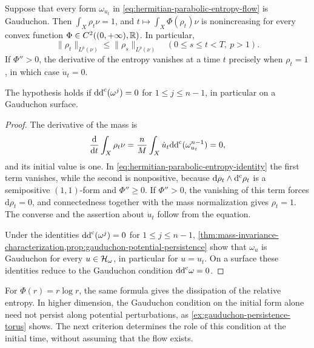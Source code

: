 \begin{corollary}\label{cor:gauduchon-parabolic-entropies}
Suppose that every form $\omega_{u_t}$ in \eqref{eq:hermitian-parabolic-entropy-flow} is Gauduchon. Then $\int_X\rho_t\nu=1$, and $t\mapsto\int_X\Phi(\rho_t)\nu$ is nonincreasing for every convex function $\Phi\in C^2((0,+\infty),\mathbb R)$. In particular,
\[
 \|\rho_t\|_{L^p(\nu)}\leq\|\rho_s\|_{L^p(\nu)}
 \quad(0\leq s\leq t<T,\ p>1).
\]
If $\Phi''>0$, the derivative of the entropy vanishes at a time $t$ precisely when $\rho_t=1$, in which case $\dot u_t=0$.

The hypothesis holds if $\mathrm{dd}^{\mathrm{c}}(\omega^j)=0$ for $1\leq j\leq n-1$, in particular on a Gauduchon surface.
\end{corollary}
\begin{proof}
The derivative of the mass is
\[
 \frac{\mathrm{d}}{\mathrm{d}t}\int_X\rho_t\nu
 =\frac nM\int_X\dot u_t\mathrm{dd}^{\mathrm{c}}(\omega_{u_t}^{n-1})=0,
\]
and its initial value is one. In \eqref{eq:hermitian-parabolic-entropy-identity} the first term vanishes, while the second is nonpositive, because $\mathrm{d}\rho_t\wedge\mathrm d^{\mathrm c}\rho_t$ is a semipositive $(1,1)$-form and $\Phi''\geq0$. If $\Phi''>0$, the vanishing of this term forces $\mathrm{d}\rho_t=0$, and connectedness together with the mass normalization gives $\rho_t=1$. The converse and the assertion about $\dot u_t$ follow from the equation.

Under the identities $\mathrm{dd}^{\mathrm{c}}(\omega^j)=0$ for $1\leq j\leq n-1$, \cref{thm:mass-invariance-characterization,prop:gauduchon-potential-persistence} show that $\omega_u$ is Gauduchon for every $u\in\mathcal H_\omega$, in particular for $u=u_t$. On a surface these identities reduce to the Gauduchon condition $\mathrm{dd}^{\mathrm{c}}\omega=0$.
\end{proof}

For $\Phi(r)=r\log r$, the same formula gives the dissipation of the relative entropy. In higher dimension, the Gauduchon condition on the initial form alone need not persist along potential perturbations, as \cref{ex:gauduchon-persistence-torus} shows. The next criterion determines the role of this condition at the initial time, without assuming that the flow exists.

